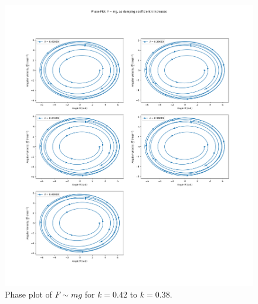 \documentclass[10pt, twocolumn]{article}
\begin{document}
\begin{figure}
    \centering
    \includegraphics[width = \columnwidth]{Projects/ForcedSimplePendulum/Plots/Phase plot of F~mg as damping coefficient k increases from 0.42 to 0.38.png}
    \caption{Phase plot of $F \sim{mg}$ for $k = 0.42$ to $k = 0.38$.}
    \label{phase plot of k 0.42 to 0.38}
\end{figure}
\end{document}
